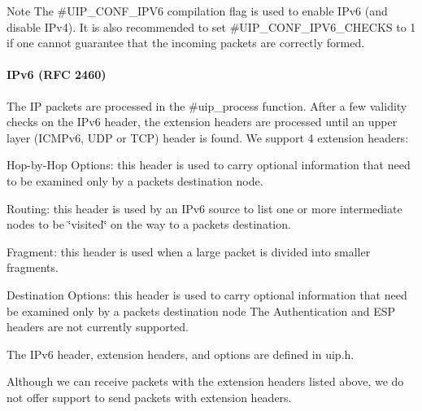 \begin{DoxyNote}{Note}
The \#\+U\+I\+P\+\_\+\+C\+O\+N\+F\+\_\+\+I\+P\+V6 compilation flag is used to enable I\+Pv6 (and disable I\+Pv4). It is also recommended to set \#\+U\+I\+P\+\_\+\+C\+O\+N\+F\+\_\+\+I\+P\+V6\+\_\+\+C\+H\+E\+C\+KS to 1 if one cannot guarantee that the incoming packets are correctly formed.
\end{DoxyNote}
\hypertarget{a00075_ipv6}{}\paragraph{I\+Pv6 (\+R\+F\+C 2460)}\label{a00075_ipv6}
The IP packets are processed in the \#uip\+\_\+process function. After a few validity checks on the I\+Pv6 header, the extension headers are processed until an upper layer (I\+C\+M\+Pv6, U\+DP or T\+CP) header is found. We support 4 extension headers\+: \begin{DoxyItemize}
\item Hop-\/by-\/\+Hop Options\+: this header is used to carry optional information that need to be examined only by a packet\textquotesingle{}s destination node. \item Routing\+: this header is used by an I\+Pv6 source to list one or more intermediate nodes to be \char`\"{}visited\char`\"{} on the way to a packet\textquotesingle{}s destination. \item Fragment\+: this header is used when a large packet is divided into smaller fragments. \item Destination Options\+: this header is used to carry optional information that need be examined only by a packet\textquotesingle{}s destination node The Authentication and E\+SP headers are not currently supported.\end{DoxyItemize}
The I\+Pv6 header, extension headers, and options are defined in uip.\+h.

Although we can receive packets with the extension headers listed above, we do not offer support to send packets with extension headers.

